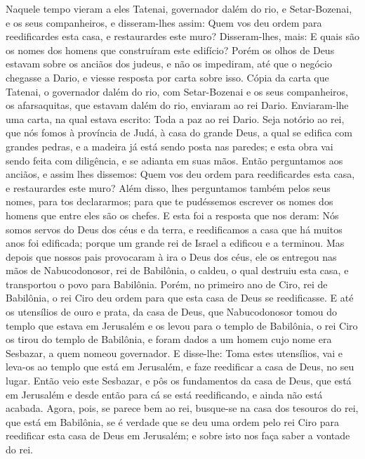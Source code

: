 Naquele tempo vieram a eles Tatenai, governador dalém do rio, e
Setar-Bozenai, e os seus companheiros, e disseram-lhes assim: Quem
vos deu ordem para reedificardes esta casa, e restaurardes este
muro? Disseram-lhes, mais: E quais são os nomes dos homens que
construíram este edifício? Porém os olhos de Deus estavam sobre
os anciãos dos judeus, e não os impediram, até que o negócio
chegasse a Dario, e viesse resposta por carta sobre isso. Cópia
da carta que Tatenai, o governador dalém do rio, com Setar-Bozenai e
os seus companheiros, os afarsaquitas, que estavam dalém do rio,
enviaram ao rei Dario. Enviaram-lhe uma carta, na qual estava
escrito: Toda a paz ao rei Dario. Seja notório ao rei, que nós
fomos à província de Judá, à casa do grande Deus, a qual se edifica
com grandes pedras, e a madeira já está sendo posta nas paredes; e
esta obra vai sendo feita com diligência, e se adianta em suas mãos.
Então perguntamos aos anciãos, e assim lhes dissemos: Quem vos
deu ordem para reedificardes esta casa, e restaurardes este muro?
Além disso, lhes perguntamos também pelos seus nomes, para
tos declararmos; para que te pudéssemos escrever os nomes dos homens
que entre eles são os chefes. E esta foi a resposta que nos
deram: Nós somos servos do Deus dos céus e da terra, e reedificamos
a casa que há muitos anos foi edificada; porque um grande rei de
Israel a edificou e a terminou. Mas depois que nossos pais
provocaram à ira o Deus dos céus, ele os entregou nas mãos de
Nabucodonosor, rei de Babilônia, o caldeu, o qual destruiu esta
casa, e transportou o povo para Babilônia. Porém, no primeiro
ano de Ciro, rei de Babilônia, o rei Ciro deu ordem para que esta
casa de Deus se reedificasse. E até os utensílios de ouro e
prata, da casa de Deus, que Nabucodonosor tomou do templo que estava
em Jerusalém e os levou para o templo de Babilônia, o rei Ciro os
tirou do templo de Babilônia, e foram dados a um homem cujo nome era
Sesbazar, a quem nomeou governador. E disse-lhe: Toma estes
utensílios, vai e leva-os ao templo que está em Jerusalém, e faze
reedificar a casa de Deus, no seu lugar. Então veio este
Sesbazar, e pôs os fundamentos da casa de Deus, que está em
Jerusalém e desde então para cá se está reedificando, e ainda não
está acabada. Agora, pois, se parece bem ao rei, busque-se na
casa dos tesouros do rei, que está em Babilônia, se é verdade que se
deu uma ordem pelo rei Ciro para reedificar esta casa de Deus em
Jerusalém; e sobre isto nos faça saber a vontade do rei.

\medskip

